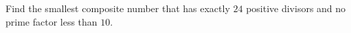 Find the smallest composite number that has exactly $24$ positive divisors and no prime factor less than $10$.
